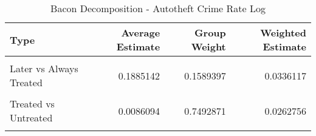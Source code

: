 \begin{table}[H]

\caption{\label{tab:tab:bacondecompositionAutotheft}Bacon Decomposition - Autotheft Crime Rate Log}
\centering
\begin{tabular}[t]{lrrr}
\toprule
Type & Average Estimate & Group Weight & Weighted Estimate\\
\midrule
\cellcolor{gray!6}{Earlier vs Later Treated} & \cellcolor{gray!6}{0.0887179} & \cellcolor{gray!6}{0.0683810} & \cellcolor{gray!6}{0.0056843}\\
Later vs Always Treated & 0.1885142 & 0.1589397 & 0.0336117\\
\cellcolor{gray!6}{Later vs Earlier Treated} & \cellcolor{gray!6}{0.0994063} & \cellcolor{gray!6}{0.0233921} & \cellcolor{gray!6}{0.0020305}\\
Treated vs Untreated & 0.0086094 & 0.7492871 & 0.0262756\\
\cellcolor{gray!6}{Total TWFE} & \cellcolor{gray!6}{NaN} & \cellcolor{gray!6}{NaN} & \cellcolor{gray!6}{0.0676020}\\
\bottomrule
\end{tabular}
\end{table}
